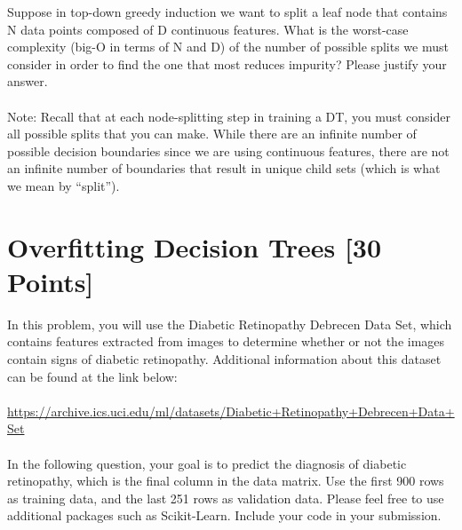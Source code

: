 \problem[4] Suppose in top-down greedy induction we want to split a leaf node that contains
N data points composed of D continuous features. What is the worst-case complexity (big-O in terms of N and D) of the number of possible splits we must consider in order to find the one that most reduces impurity? Please justify your answer.\\
\\
Note: Recall that at each node-splitting step in training a DT, you must consider all possible splits that you can make. While there are an infinite number of possible decision boundaries since we are using continuous features, there are not an infinite number of boundaries that result in unique child sets (which is what we mean by “split”).
\begin{solution}\end{solution}
\newpage


\section{Overfitting Decision Trees [30 Points]}

In this problem, you will use the Diabetic Retinopathy Debrecen Data Set, which contains features extracted from images to determine whether or not the images contain signs of diabetic retinopathy. Additional information about this dataset can be found at the link below:\\
\\
\url{https://archive.ics.uci.edu/ml/datasets/Diabetic+Retinopathy+Debrecen+Data+Set}\\
\\
In the following question, your goal is to predict the diagnosis of diabetic retinopathy, which is the final column in the data matrix. Use the first 900 rows as training data, and the last 251 rows as validation data. Please feel free to use additional packages such as Scikit-Learn. Include your code in your submission.

